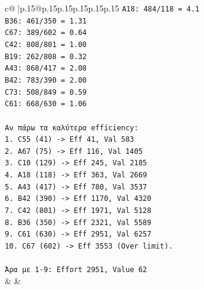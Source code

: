 \documentclass{article}
\begin{document}
{\begin{supertabular}{c@{$\;$}|p{.15\linewidth}@{}p{.15\linewidth}p{.15\linewidth}p{.15\linewidth}p{.15\linewidth}p{.15\linewidth}}
{{{\texttt{A18: 484/118 = 4.1} \\
\texttt{B36: 461/350 = 1.31} \\
\texttt{C67: 389/602 = 0.64} \\
\texttt{C42: 808/801 = 1.00} \\
\texttt{B19: 262/808 = 0.32} \\
\texttt{A43: 868/417 = 2.08} \\
\texttt{B42: 783/390 = 2.00} \\
\texttt{C73: 508/849 = 0.59} \\
\texttt{C61: 668/630 = 1.06} \\
\\ 
\texttt{Αν πάρω τα καλύτερα efficiency:} \\
\texttt{1. C55 (41) {-}> Eff 41, Val 583} \\
\texttt{2. A67 (75) {-}> Eff 116, Val 1405} \\
\texttt{3. C10 (129) {-}> Eff 245, Val 2185} \\
\texttt{4. A18 (118) {-}> Eff 363, Val 2669} \\
\texttt{5. A43 (417) {-}> Eff 780, Val 3537} \\
\texttt{6. B42 (390) {-}> Eff 1170, Val 4320} \\
\texttt{7. C42 (801) {-}> Eff 1971, Val 5128} \\
\texttt{8. B36 (350) {-}> Eff 2321, Val 5589} \\
\texttt{9. C61 (630) {-}> Eff 2951, Val 6257} \\
\texttt{10. C67 (602) {-}> Eff 3553 (Over limit).} \\
\\ 
\texttt{Άρα με 1{-}9: Effort 2951, Value 62} \\
            }
        }
    }
    & & \\ \\


\end{supertabular}}
\end{document}
